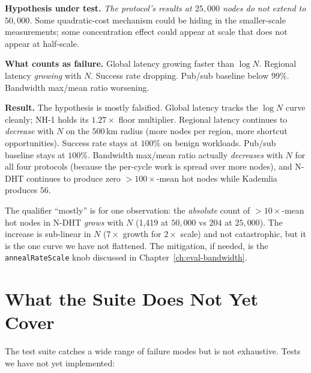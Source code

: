 \documentclass[twoside,nobib]{tufte-book}
\newcommand{\NDHT}{N-DHT\xspace}
\begin{document}
\textbf{Hypothesis under test.} \emph{The protocol's results at
$25{,}000$ nodes do not extend to $50{,}000$.} Some
quadratic-cost mechanism could be hiding in the smaller-scale
measurements; some concentration effect could appear at scale
that does not appear at half-scale.

\textbf{What counts as failure.} Global latency growing faster
than $\log N$. Regional latency \emph{growing} with $N$. Success
rate dropping. Pub/sub baseline below $99\%$. Bandwidth max/mean
ratio worsening.

\textbf{Result.} The hypothesis is mostly falsified. Global
latency tracks the $\log N$ curve cleanly; NH-1 holds its
$1.27\times$ floor multiplier. Regional latency continues to
\emph{decrease} with $N$ on the $500$\,km radius (more nodes per
region, more shortcut opportunities). Success rate stays at
$100\%$ on benign workloads. Pub/sub baseline stays at $100\%$.
Bandwidth max/mean ratio actually \emph{decreases} with $N$ for
all four protocols (because the per-cycle work is spread over
more nodes), and \NDHT continues to produce zero
$>100\times$-mean hot nodes while Kademlia produces $56$.

The qualifier ``mostly'' is for one observation: the
\emph{absolute} count of $>10\times$-mean hot nodes in \NDHT
\emph{grows} with $N$ (1{,}419 at $50{,}000$ vs $204$ at
$25{,}000$). The increase is sub-linear in $N$ ($7\times$
growth for $2\times$ scale) and not catastrophic, but it is the
one curve we have not flattened. The mitigation, if needed, is
the \texttt{annealRateScale} knob discussed in
Chapter~\ref{ch:eval-bandwidth}.

\section{What the Suite Does Not Yet Cover}

 The test suite catches a wide range
of failure modes but is not exhaustive. Tests we have not yet
implemented:
\end{document}
